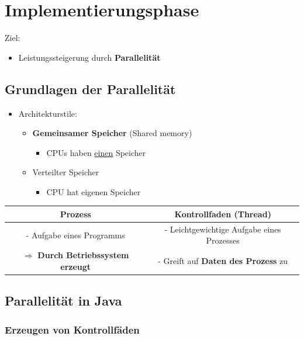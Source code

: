 \section{Implementierungsphase}
	
Ziel:
				
\begin{itemize}
\item Leistungssteigerung durch \textbf{Parallelität}
\end{itemize}

\subsection{Grundlagen der Parallelität}
	
\begin{itemize}
\item Architekturstile:
\begin{itemize}
\item \textbf{Gemeinsamer Speicher} (Shared memory)
\begin{itemize}
\item CPUs haben \underline{einen} Speicher
\end{itemize}
\item Verteilter Speicher
\begin{itemize}
\item CPU hat eigenen Speicher
\end{itemize}
\end{itemize}
\end{itemize}
		
\begin{center}
\begin{tabular}{c|c}
Prozess & Kontrollfaden (Thread) \\
\hline
- Aufgabe eines Programms & - Leichtgewichtige Aufgabe eines Prozesses \\
$\Rightarrow$ \textbf{Durch Betriebssystem erzeugt} & - Greift auf \textbf{Daten des Prozess} zu \\
\end{tabular}
\end{center}
	
\subsection{Parallelität in Java}
		
\subsubsection{Erzeugen von Kontrollfäden}
			
